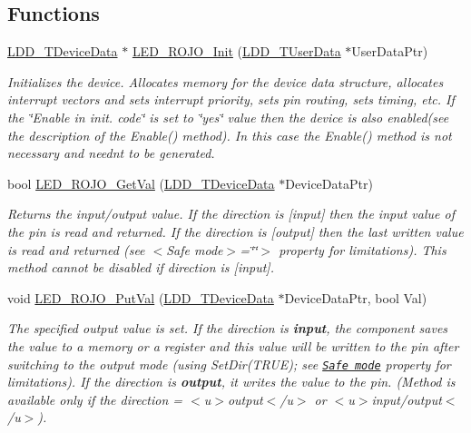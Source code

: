 \subsection*{Functions}
\begin{DoxyCompactItemize}
\item 
\hyperlink{group___p_e___types__module_gac5cf1362f1f0e3a2ce71b1bf2276d091}{L\+D\+D\+\_\+\+T\+Device\+Data} $\ast$ \hyperlink{group___l_e_d___r_o_j_o__module_ga6712b7fdbb355647170f0518b432acfa}{L\+E\+D\+\_\+\+R\+O\+J\+O\+\_\+\+Init} (\hyperlink{group___p_e___types__module_ga0b66a73f87238a782318aa0be7578e35}{L\+D\+D\+\_\+\+T\+User\+Data} $\ast$User\+Data\+Ptr)
\begin{DoxyCompactList}\small\item\em Initializes the device. Allocates memory for the device data structure, allocates interrupt vectors and sets interrupt priority, sets pin routing, sets timing, etc. If the \char`\"{}\+Enable
    in init. code\char`\"{} is set to \char`\"{}yes\char`\"{} value then the device is also enabled(see the description of the Enable() method). In this case the Enable() method is not necessary and needn\textquotesingle{}t to be generated. \end{DoxyCompactList}\item 
bool \hyperlink{group___l_e_d___r_o_j_o__module_ga7e64262a99bd83dd682023b414484671}{L\+E\+D\+\_\+\+R\+O\+J\+O\+\_\+\+Get\+Val} (\hyperlink{group___p_e___types__module_gac5cf1362f1f0e3a2ce71b1bf2276d091}{L\+D\+D\+\_\+\+T\+Device\+Data} $\ast$Device\+Data\+Ptr)
\begin{DoxyCompactList}\small\item\em Returns the input/output value. If the direction is \mbox{[}input\mbox{]} then the input value of the pin is read and returned. If the direction is \mbox{[}output\mbox{]} then the last written value is read and returned (see $<$\+Safe mode$>$=\char`\"{}\char`\"{}$>$ property for limitations). This method cannot be disabled if direction is \mbox{[}input\mbox{]}. \end{DoxyCompactList}\item 
void \hyperlink{group___l_e_d___r_o_j_o__module_ga8374d173d4cb867183484e9a78fe2375}{L\+E\+D\+\_\+\+R\+O\+J\+O\+\_\+\+Put\+Val} (\hyperlink{group___p_e___types__module_gac5cf1362f1f0e3a2ce71b1bf2276d091}{L\+D\+D\+\_\+\+T\+Device\+Data} $\ast$Device\+Data\+Ptr, bool Val)
\begin{DoxyCompactList}\small\item\em The specified output value is set. If the direction is {\bfseries  input}, the component saves the value to a memory or a register and this value will be written to the pin after switching to the output mode (using {\ttfamily Set\+Dir(\+T\+R\+U\+E)}; see \href{BitIOProperties.html#SafeMode}{\tt Safe mode} property for limitations). If the direction is {\bfseries output}, it writes the value to the pin. (Method is available only if the direction = $<$u$>${\ttfamily output}$<$/u$>$ or $<$u$>${\ttfamily  input/output}$<$/u$>$). \end{DoxyCompactList}\item 

\end{DoxyCompactItemize}
